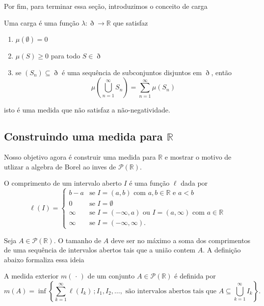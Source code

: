 \documentclass[a4paper, 11pt]{book}
\theoremstyle{definition}
\newcommand{\bR}{\mathbb{R}}
\newcommand{\cP}{\mathcal{P}}
\begin{document}
Por fim, para terminar essa seção, introduzimos o conceito de carga
\begin{dbox}
    Uma carga é uma função $\lambda : \eth \to \bR$ que satisfaz
    \begin{enumerate}[leftmargin=*]
        \item $\mu(\emptyset) = 0$
        \item $\mu(S) \geqslant 0$ para todo $S \in \eth$
        \item se $(S_n) \subseteq \eth$ é uma sequência de subconjuntos disjuntos em $\eth$, então
        \[
            \mu \left( \bigcup_{n=1}^{\infty} S_n \right) = \sum_{n=1}^{\infty} \mu(S_n)
        \]
    \end{enumerate}
    isto é uma medida que não satisfaz a não-negatividade.
\end{dbox}


\subsection{Construindo uma medida para $\bR$}

Nosso objetivo agora é construir uma medida para $\bR$ e mostrar o motivo de utlizar a algebra de Borel ao inves de $\cP(\bR)$.

\begin{dbox}
    O comprimento de um intervalo aberto $I$ é uma função $\ell$ dada por
    \[
        \ell(I) =
        \left\{  
            \begin{array}{ll}
                b  - a & \text{se } I = (a,b) \text{ com } a,b \in \bR \text{ e } a < b\\
                0 & \text{se } I = \emptyset\\
                \infty & \text{se } I = (-\infty, a) \text{ ou } I = (a,\infty) \text{ com } a\in\bR \\
                \infty & \text{se } I = (-\infty,\infty).
            \end{array}
        \right.
    \]
\end{dbox}

Seja $A \in \cP(\bR)$. O tamanho de $A$ deve ser no máximo a soma dos comprimentos de uma sequência de intervalos abertos tais que a união contem $A$. A definição abaixo formaliza essa ideia

\begin{dbox}
    A medida exterior $m(\,\cdot\,)$ de um conjunto $A \in \cP(\bR)$ é definida por
    \[
        m(A) = \inf\left\{\sum_{k=1}^{\infty} \ell(I_k) \,; I_1, I_2,\dots, \text{ são intervalos abertos tais que } A \subseteq \bigcup_{k=1}^\infty I_k \right\}.
    \]
\end{dbox}
\end{document}
